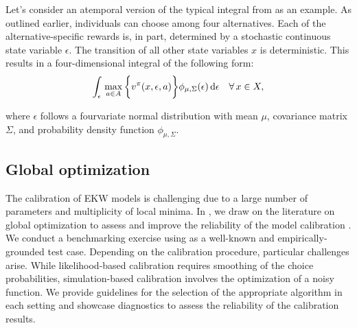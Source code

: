 \noindent Let's consider an atemporal version of the typical integral from \citet{Keane.1994} as an example. As outlined earlier, individuals can choose among four alternatives. Each of the alternative-specific rewards is, in part, determined by a stochastic continuous state variable $\epsilon$. The transition of all other state variables $x$ is deterministic. This results in a four-dimensional integral of the following form:
%
\begin{align*}
   \int_{\epsilon}\, \max_{a\in A} \bigg\{v^\pi(x, \epsilon, a)\bigg\} \phi_{\mu, \Sigma}(\epsilon) \mathop{}\!\mathrm{d}\epsilon \quad\forall\, x \in X,
\end{align*}

\noindent where $\epsilon$ follows a fourvariate normal distribution with mean $\mu$, covariance matrix $ \Sigma$, and probability density function $\phi_{\mu, \Sigma}$.
\subsection{Global optimization}
The calibration of EKW models is challenging due to a large number of parameters and multiplicity of local minima. In \citet{Gabler.2020}, we draw on the literature on global optimization to assess and improve the reliability of the model calibration \citep{Locatelli.2013, Nocedal.2006}.\\

\noindent We conduct a benchmarking exercise using \citet{Keane.1994, Keane.1997} as a well-known and empirically-grounded test case. Depending on the calibration procedure, particular challenges arise. While likelihood-based calibration requires smoothing of the choice probabilities, simulation-based calibration involves the optimization of a noisy function. We provide guidelines for the selection of the appropriate algorithm in each setting and showcase diagnostics to assess the reliability of the calibration results.
